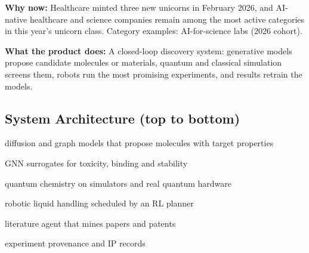 \documentclass[10pt,a4paper]{article}
\begin{document}
\begin{tcolorbox}[colback=l1bg,colframe=l1bg,arc=2pt,borderline west={3pt}{0pt}{saffron},top=2pt,bottom=2pt]\small\textbf{Why now:} Healthcare minted three new unicorns in February 2026, and AI-native healthcare and science companies remain among the most active categories in this year's unicorn class. {\color{muted}Category examples: AI-for-science labs (2026 cohort).}\end{tcolorbox}
\begin{tcolorbox}[colback=l3bg,colframe=l3bg,arc=2pt,borderline west={3pt}{0pt}{igreen},top=2pt,bottom=2pt]\small\textbf{What the product does:} A closed-loop discovery system: generative models propose candidate molecules or materials, quantum and classical simulation screens them, robots run the most promising experiments, and results retrain the models.\end{tcolorbox}
\subsection*{System Architecture (top to bottom)}
\begin{tcolorbox}[colback=lay0,colframe=lay0,arc=2pt,top=1.5pt,bottom=1.5pt,left=6pt,before skip=2pt,after skip=2pt]\small{} diffusion and graph models that propose molecules with target properties\end{tcolorbox}
\begin{tcolorbox}[colback=lay1,colframe=lay1,arc=2pt,top=1.5pt,bottom=1.5pt,left=6pt,before skip=2pt,after skip=2pt]\small{} GNN surrogates for toxicity, binding and stability\end{tcolorbox}
\begin{tcolorbox}[colback=lay2,colframe=lay2,arc=2pt,top=1.5pt,bottom=1.5pt,left=6pt,before skip=2pt,after skip=2pt]\small{} quantum chemistry on simulators and real quantum hardware\end{tcolorbox}
\begin{tcolorbox}[colback=lay3,colframe=lay3,arc=2pt,top=1.5pt,bottom=1.5pt,left=6pt,before skip=2pt,after skip=2pt]\small{} robotic liquid handling scheduled by an RL planner\end{tcolorbox}
\begin{tcolorbox}[colback=lay4,colframe=lay4,arc=2pt,top=1.5pt,bottom=1.5pt,left=6pt,before skip=2pt,after skip=2pt]\small{} literature agent that mines papers and patents\end{tcolorbox}
\begin{tcolorbox}[colback=lay5,colframe=lay5,arc=2pt,top=1.5pt,bottom=1.5pt,left=6pt,before skip=2pt,after skip=2pt]\small{} experiment provenance and IP records\end{tcolorbox}
\end{document}
